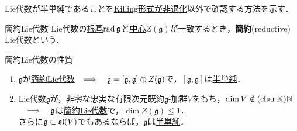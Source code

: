 \documentclass[rep_main]{subfiles}
\begin{document}
Lie代数が半単純であることを\hyperref[thm:semisimple-LieAlg-iff]{Killing形式が非退化}以外で確認する方法を示す．
\begin{mydef}[label=def:red-Lie-alg]{簡約Lie代数}
	Lie代数の\hyperref[def:rad-LieAlg]{根基}$\operatorname{rad}\mathfrak{g}$と\hyperref[def:center-LieAlg]{中心}$Z(\mathfrak{g})$が一致するとき，\textbf{簡約}(reductive) Lie代数という．
\end{mydef}
\begin{myprop}[label=prop:red-Lie-alg]{簡約Lie代数の性質}
	\begin{enumerate}
		\item $\mathfrak{g}$が\hyperref[def:red-Lie-alg]{簡約Lie代数}$  \quad \Longrightarrow \quad  \mathfrak{g} = [\mathfrak{g}, \mathfrak{g}] \oplus Z(\mathfrak{g})$で，$[\mathfrak{g}, \mathfrak{g}]$は\hyperref[def:semisimple-LieAlg]{半単純}．
		\item Lie代数$\mathfrak{g}$が，非零な忠実な有限次元既約$\mathfrak{g}$-加群$V$をもち，$\dim V \notin (\operatorname{char}\mathbb{K})\mathbb{N}$\\
		$\quad \Longrightarrow \quad  \mathfrak{g}$は\hyperref[def:red-Lie-alg]{簡約Lie代数}で，$\dim Z(\mathfrak{g}) \leq 1$．\\
		さらに$\mathfrak{g} \subset \mathfrak{sl}(V)$でもあるならば，$\mathfrak{g}$は\hyperref[def:semisimple-LieAlg]{半単純}．
	\end{enumerate}
\end{myprop}
\end{document}
